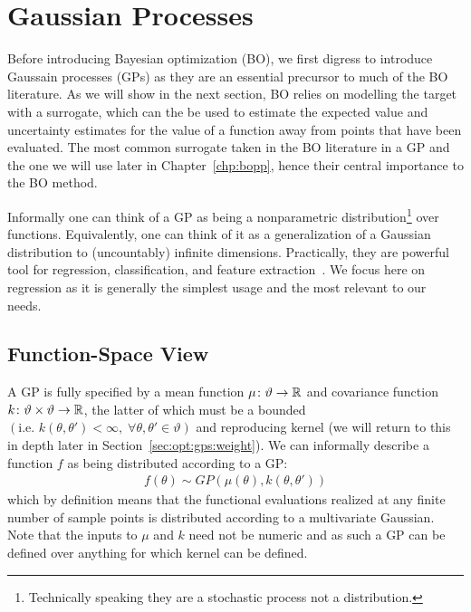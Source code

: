 
\section{Gaussian Processes}
\label{sec:opt:GPs}

Before introducing Bayesian optimization (BO), we first digress to introduce Gaussain
processes (GPs) as they are an essential precursor to much of the BO literature.  
As we will show in the next section, BO relies on modelling the target with a surrogate,
which can the be used to estimate the expected value and uncertainty estimates for 
the value of a function away from points that have been evaluated.  The most common
surrogate taken in the BO literature in a GP and the one we will use later in Chapter~\ref{chp:bopp}, 
hence their central importance to the BO method.

Informally one can think of a GP \citep{rasmussen2006gaussian} as being a nonparametric 
distribution\footnote{Technically speaking they are a stochastic process not a distribution.} over functions.
Equivalently, one can think of it as a generalization of a Gaussian distribution
to (uncountably) infinite dimensions.  Practically, they are powerful tool for regression, classification,
and feature extraction~\citep{kuss2005assessing,lawrence2004gaussian}.  We focus here on regression as it is generally
the simplest usage and the most relevant to our needs.

\subsection{Function-Space View}
\label{sec:opt:GPs:function}

A GP is fully specified by a mean function $\mu \colon \vartheta \rightarrow \mathbb{R}$ and covariance function 
$k \colon \vartheta \times \vartheta \rightarrow \mathbb{R}$, the latter of which must be a bounded 
$\left(\text{i.e. }k\left(\theta,\theta'\right)<\infty, \; \forall \theta,\theta' \in \vartheta\right)$ 
and reproducing kernel (we will return to this in depth later in Section~\ref{sec:opt:gps:weight}).  
We can informally describe a function $f$ as being distributed 
according to a GP:
\begin{align}
\label{eq:GP}
f \left(\theta\right) \sim GP \left(\mu\left(\theta\right), k\left(\theta,\theta'\right)\right)
\end{align}
which by definition means that the functional evaluations realized at any finite number of sample points is distributed according to a multivariate Gaussian. Note that the inputs to $\mu$ and $k$ need not be numeric and as such a GP can be defined over anything for which kernel can be defined.

